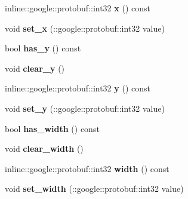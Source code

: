 \begin{DoxyCompactItemize}
\item 
\hypertarget{class_game_object_notify_a29d7c1745284cc5b78956cc316376738}{inline\-::google\-::protobuf\-::int32 {\bfseries x} () const }\label{class_game_object_notify_a29d7c1745284cc5b78956cc316376738}

\item 
\hypertarget{class_game_object_notify_a998082bfecd2c4cb76c84065a65b8e2a}{void {\bfseries set\-\_\-x} (\-::google\-::protobuf\-::int32 value)}\label{class_game_object_notify_a998082bfecd2c4cb76c84065a65b8e2a}

\item 
\hypertarget{class_game_object_notify_a74513aef5aceea983df19a445352ccb9}{bool {\bfseries has\-\_\-y} () const }\label{class_game_object_notify_a74513aef5aceea983df19a445352ccb9}

\item 
\hypertarget{class_game_object_notify_a6f7b06cf818edf08ea2d5c09fd769853}{void {\bfseries clear\-\_\-y} ()}\label{class_game_object_notify_a6f7b06cf818edf08ea2d5c09fd769853}

\item 
\hypertarget{class_game_object_notify_aefde9869ad1e80659b4951398a460f57}{inline\-::google\-::protobuf\-::int32 {\bfseries y} () const }\label{class_game_object_notify_aefde9869ad1e80659b4951398a460f57}

\item 
\hypertarget{class_game_object_notify_a9b2ee70f340e34b895d5c58bbda1967a}{void {\bfseries set\-\_\-y} (\-::google\-::protobuf\-::int32 value)}\label{class_game_object_notify_a9b2ee70f340e34b895d5c58bbda1967a}

\item 
\hypertarget{class_game_object_notify_ac571c7cc6962f862a30b3ae8f61432c7}{bool {\bfseries has\-\_\-width} () const }\label{class_game_object_notify_ac571c7cc6962f862a30b3ae8f61432c7}

\item 
\hypertarget{class_game_object_notify_abd5293bda07b2a790702c7e039d7115a}{void {\bfseries clear\-\_\-width} ()}\label{class_game_object_notify_abd5293bda07b2a790702c7e039d7115a}

\item 
\hypertarget{class_game_object_notify_a53e65ba98c60fada040ccb9b1691bc32}{inline\-::google\-::protobuf\-::int32 {\bfseries width} () const }\label{class_game_object_notify_a53e65ba98c60fada040ccb9b1691bc32}

\item 
\hypertarget{class_game_object_notify_adc1447c2773f943ff80233f89af49bc6}{void {\bfseries set\-\_\-width} (\-::google\-::protobuf\-::int32 value)}\label{class_game_object_notify_adc1447c2773f943ff80233f89af49bc6}


\end{DoxyCompactItemize}
